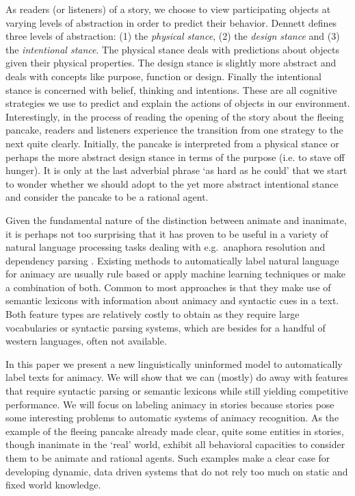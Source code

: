 \documentclass[a4paper,UKenglish]{oasics}
\begin{document}
As readers (or listeners) of a story, we choose to view participating
objects at varying levels of abstraction in order to predict their
behavior. Dennett \cite{dennett:96} defines three levels of
abstraction: (1) the \textit{physical stance}, (2) the \textit{design
  stance} and (3) the \textit{intentional stance}. The physical stance
deals with predictions about objects given their physical
properties. The design stance is slightly more abstract and deals with
concepts like purpose, function or design. Finally the intentional
stance is concerned with belief, thinking and intentions. These are
all cognitive strategies we use to predict and explain the actions of
objects in our environment. Interestingly, in the process of reading
the opening of the story about the fleeing pancake, readers and
listeners experience the transition from one strategy to the next
quite clearly. Initially, the pancake is interpreted from a physical
stance or perhaps the more abstract design stance in terms of the
purpose (i.e. to stave off hunger). It is only at the last adverbial
phrase `as hard as he could' that we start to wonder whether we should
adopt to the yet more abstract intentional stance and consider the
pancake to be a rational agent.

Given the fundamental nature of the distinction between animate and
inanimate, it is perhaps not too surprising that it has proven to be
useful in a variety of natural language processing tasks dealing with
e.g.\ anaphora resolution and dependency parsing
\cite{orasan:07,lee:13,ovr:niv:07}. Existing methods to automatically
label natural language for animacy are usually rule based or apply
machine learning techniques or make a combination of both. Common to
most approaches is that they make use of semantic lexicons with
information about animacy and syntactic cues in a text. Both feature
types are relatively costly to obtain as they require large
vocabularies or syntactic parsing systems, which are besides for a
handful of western languages, often not available.

In this paper we present a new linguistically uninformed model to
automatically label texts for animacy. We will show that we can (mostly)
do away with features that require syntactic parsing or semantic
lexicons while still yielding competitive performance. We will focus
on labeling animacy in stories because stories pose some interesting
problems to automatic systems of animacy recognition. As the example
of the fleeing pancake already made clear, quite some entities in
stories, though inanimate in the `real' world, exhibit all behavioral
capacities to consider them to be animate and rational agents. Such
examples make a clear case for developing dynamic, data driven systems
that do not rely too much on static and fixed world knowledge.
\end{document}
